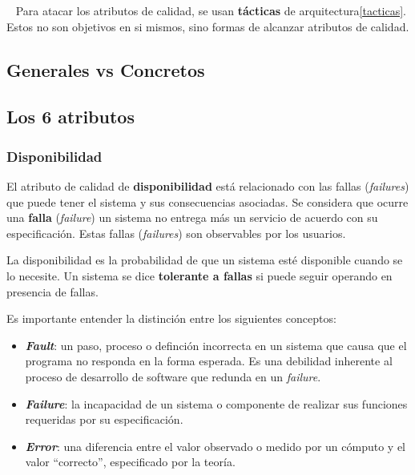 \documentclass[]{article}
\begin{document}
~\newline
Para atacar los atributos de calidad, se usan \textbf{tácticas} de arquitectura\ref{tacticas}. Estos no son objetivos en si mismos, sino formas de alcanzar atributos de calidad.

\subsection{Generales vs Concretos}


\subsection{Los 6 atributos}
\subsubsection{Disponibilidad}
El atributo de calidad de \textbf{disponibilidad} está relacionado con las fallas (\emph{failures}) que puede tener el sistema y sus consecuencias asociadas. Se considera que ocurre una \textbf{falla} (\emph{failure}) un sistema no entrega más un servicio de acuerdo con su especificación. Estas fallas (\emph{failures}) son observables por los usuarios.

La disponibilidad es la probabilidad de que un sistema esté disponible cuando se lo necesite. Un sistema se dice \textbf{tolerante a fallas} si puede seguir operando en presencia de fallas.

Es importante entender la distinción entre los siguientes conceptos:
\begin{itemize}
	\item \emph{\textbf{Fault}}: un paso, proceso o definción incorrecta en un sistema que causa que el programa no responda en la forma esperada. Es una debilidad inherente al proceso de desarrollo de software que redunda en un \emph{failure}.
	\item \emph{\textbf{Failure}}: la incapacidad de un sistema o componente de realizar sus funciones requeridas por su especificación.
	\item \emph{\textbf{Error}}: una diferencia entre el valor observado o medido por un cómputo y el valor ``correcto'', especificado por la teoría.
\end{itemize}
\end{document}
